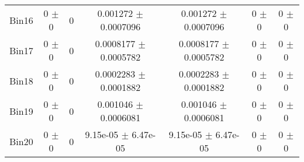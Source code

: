 \begin{tabular}{@{\extracolsep{4pt}}lcccccc@{}}
     Bin16 & 0 $\pm$ 0 & 0 & 0.001272 $\pm$ 0.0007096 & 0.001272 $\pm$ 0.0007096 & 0 $\pm$ 0 & 0 $\pm$ 0 \\ 
     Bin17 & 0 $\pm$ 0 & 0 & 0.0008177 $\pm$ 0.0005782 & 0.0008177 $\pm$ 0.0005782 & 0 $\pm$ 0 & 0 $\pm$ 0 \\ 
     Bin18 & 0 $\pm$ 0 & 0 & 0.0002283 $\pm$ 0.0001882 & 0.0002283 $\pm$ 0.0001882 & 0 $\pm$ 0 & 0 $\pm$ 0 \\ 
     Bin19 & 0 $\pm$ 0 & 0 & 0.001046 $\pm$ 0.0006081 & 0.001046 $\pm$ 0.0006081 & 0 $\pm$ 0 & 0 $\pm$ 0 \\ 
     Bin20 & 0 $\pm$ 0 & 0 & 9.15e-05 $\pm$ 6.47e-05 & 9.15e-05 $\pm$ 6.47e-05 & 0 $\pm$ 0 & 0 $\pm$ 0 \\ 
\hline\hline
  \end{tabular}
